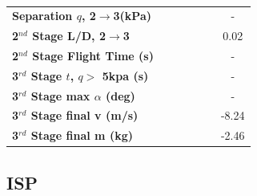 \begin{table}[ht!]
\begin{tabular}{l c c c c c c}
	\textbf{Separation $q$, 2$\rightarrow$3(kPa)}
	& \secondthirdSeparationqCdNinetyNoReturn
	& \secondthirdSeparationqCdNinetyFiveNoReturn
	& \secondthirdSeparationqCdStandardNoReturn
	& \secondthirdSeparationqCdOneHundredFiveNoReturn
	& \secondthirdSeparationqCdOneHundredTenNoReturn
	& -
	\\
	\textbf{2$^{nd}$ Stage L/D, 2$\rightarrow$3}
	& \secondthirdSeparationLDCdNinetyNoReturn
	& \secondthirdSeparationLDCdNinetyFiveNoReturn
	& \secondthirdSeparationLDCdStandardNoReturn
	& \secondthirdSeparationLDCdOneHundredFiveNoReturn
	& \secondthirdSeparationLDCdOneHundredTenNoReturn
	&0.02
	\\
	\textbf{2$^{nd}$ Stage Flight Time (s)}
	& \secondFlightTimeCdNinetyNoReturn
	& \secondFlightTimeCdNinetyFiveNoReturn
	& \secondFlightTimeCdStandardNoReturn
	& \secondFlightTimeCdOneHundredFiveNoReturn
	& \secondFlightTimeCdOneHundredTenNoReturn
	& -
	\\
	\textbf{3$^{rd}$ Stage $t$, $q >$ 5kpa (s)}
	& \thirdqOverFiveCdNinetyNoReturn
	& \thirdqOverFiveCdNinetyFiveNoReturn
	& \thirdqOverFiveCdStandardNoReturn
	& \thirdqOverFiveCdOneHundredFiveNoReturn
	& \thirdqOverFiveCdOneHundredTenNoReturn
	& -
	\\
	\textbf{3$^{rd}$ Stage max $\alpha$ (deg)}
	& \thirdmaxAoACdNinetyNoReturn
	& \thirdmaxAoACdNinetyFiveNoReturn
	& \thirdmaxAoACdStandardNoReturn
	& \thirdmaxAoACdOneHundredFiveNoReturn
	& \thirdmaxAoACdOneHundredTenNoReturn
	& -
	\\
	\textbf{3$^{rd}$ Stage final v (m/s)}
	& \thirdcircvCdNinetyNoReturn
	& \thirdcircvCdNinetyFiveNoReturn
	& \thirdcircvCdStandardNoReturn
	& \thirdcircvCdOneHundredFiveNoReturn
	& \thirdcircvCdOneHundredTenNoReturn
	&-8.24
	\\
	\textbf{3$^{rd}$ Stage final m (kg)}
	& \thirdcircmCdNinetyNoReturn
	& \thirdcircmCdNinetyFiveNoReturn
	& \thirdcircmCdStandardNoReturn
	& \thirdcircmCdOneHundredFiveNoReturn
	& \thirdcircmCdOneHundredTenNoReturn
	&-2.46
	\\
	\hline 
\end{tabular} 
\caption{}
\label{tab:DragVariationNoReturn}
\end{table}

\subsection{ISP}

